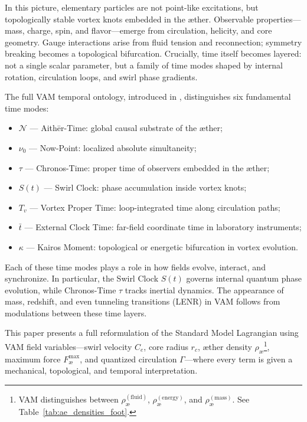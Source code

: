 \documentclass[12pt]{article}
\begin{document}
In this picture, elementary particles are not point-like excitations, but topologically stable vortex knots embedded in the æther. Observable properties—mass, charge, spin, and flavor—emerge from circulation, helicity, and core geometry. Gauge interactions arise from fluid tension and reconnection; symmetry breaking becomes a topological bifurcation. Crucially, time itself becomes layered: not a single scalar parameter, but a family of time modes shaped by internal rotation, circulation loops, and swirl phase gradients.

The full VAM temporal ontology, introduced in \cite{iskandarani2025swirlgravity}, distinguishes six fundamental time modes:
\begin{itemize}
    \item $\mathcal{N}$ — Aithēr-Time: global causal substrate of the æther;
    \item $\nu_0$ — Now-Point: localized absolute simultaneity;
    \item $\tau$ — Chronos-Time: proper time of observers embedded in the æther;
    \item $S(t)$ — Swirl Clock: phase accumulation inside vortex knots;
    \item $T_v$ — Vortex Proper Time: loop-integrated time along circulation paths;
    \item $\bar{t}$ — External Clock Time: far-field coordinate time in laboratory instruments;
    \item $\kappa$ — Kairos Moment: topological or energetic bifurcation in vortex evolution.
\end{itemize}

Each of these time modes plays a role in how fields evolve, interact, and synchronize. In particular, the Swirl Clock $S(t)$ governs internal quantum phase evolution, while Chronos-Time $\tau$ tracks inertial dynamics. The appearance of mass, redshift, and even tunneling transitions (LENR) in VAM follows from modulations between these time layers.

This paper presents a full reformulation of the Standard Model Lagrangian using VAM field variables—swirl velocity $C_e$, core radius $r_c$, æther density $\rho_\text{\ae}$\footnote{VAM distinguishes between $\rho_\text{\ae}^{(\text{fluid})}$, $\rho_\text{\ae}^{(\text{energy})}$, and $\rho_\text{\ae}^{(\text{mass})}$. See Table~\ref{tab:ae_densities_foot}.}, maximum force $F^{\text{max}}_{\text{\ae}}$, and quantized circulation $\Gamma$—where every term is given a mechanical, topological, and temporal interpretation.
\end{document}
